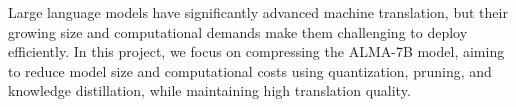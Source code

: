 Large language models have significantly advanced machine translation, but their growing size and computational demands make them challenging to deploy efficiently. In this project, we focus on compressing the ALMA-7B model, aiming to reduce model size and computational costs using quantization, pruning, and knowledge distillation, while maintaining high translation quality.


